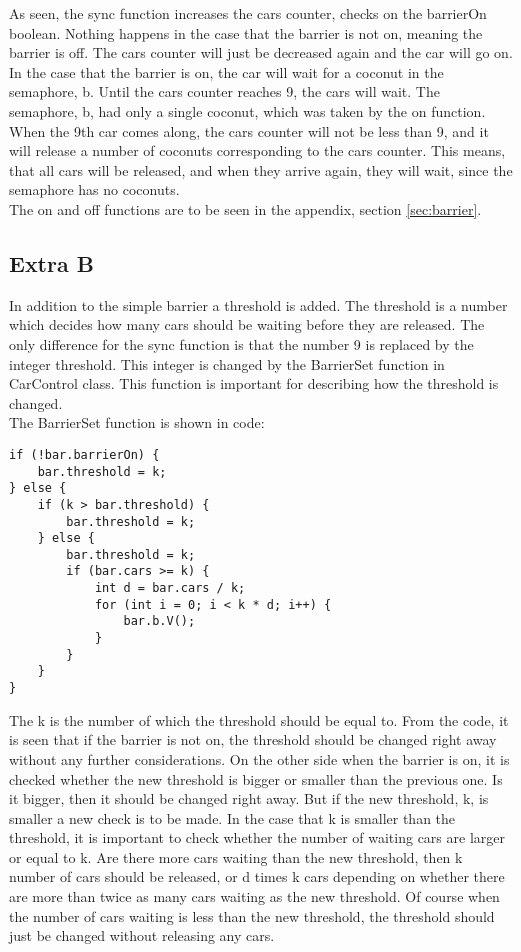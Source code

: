 As seen, the sync function increases the cars counter, checks on the barrierOn boolean. Nothing happens in the case that the barrier is not on, meaning the barrier is off. The cars counter will just be decreased again and the car will go on. \\
In the case that the barrier is on, the car will wait for a coconut in the semaphore, b. Until the cars counter reaches 9, the cars will wait. The semaphore, b, had only a single coconut, which was taken by the on function. When the 9th car comes along, the cars counter will not be less than 9, and it will release a number of coconuts corresponding to the cars counter. This means, that all cars will be released, and when they arrive again, they will wait, since the semaphore has no coconuts. \\
The on and off functions are to be seen in the appendix, section \ref{sec:barrier}.

\subsection{Extra B}
In addition to the simple barrier a threshold is added. The threshold is a number which decides how many cars should be waiting before they are released. The only difference for the sync function is that the number 9 is replaced by the integer threshold. This integer is changed by the BarrierSet function in CarControl class. This function is important for describing how the threshold is changed.\\
The BarrierSet function is shown in code:

\begin{lstlisting}
if (!bar.barrierOn) {
	bar.threshold = k;
} else {
	if (k > bar.threshold) {
		bar.threshold = k;
	} else {
		bar.threshold = k;
		if (bar.cars >= k) {
			int d = bar.cars / k;
			for (int i = 0; i < k * d; i++) {
				bar.b.V();
			}
		}
	}
}
\end{lstlisting}
\vspace{.8cm}

The k is the number of which the threshold should be equal to. From the code, it is seen that if the barrier is not on, the threshold should be changed right away without any further considerations. On the other side when the barrier is on, it is checked whether the new threshold is bigger or smaller than the previous one. Is it bigger, then it should be changed right away. But if the new threshold, k, is smaller a new check is to be made. In the case that k is smaller than the threshold, it is important to check whether the number of waiting cars are larger or equal to k. Are there more cars waiting than the new threshold, then k number of cars should be released, or d times k cars depending on whether there are more than twice as many cars waiting as the new threshold. Of course when the number of cars waiting is less than the new threshold, the threshold should just be changed without releasing any cars.